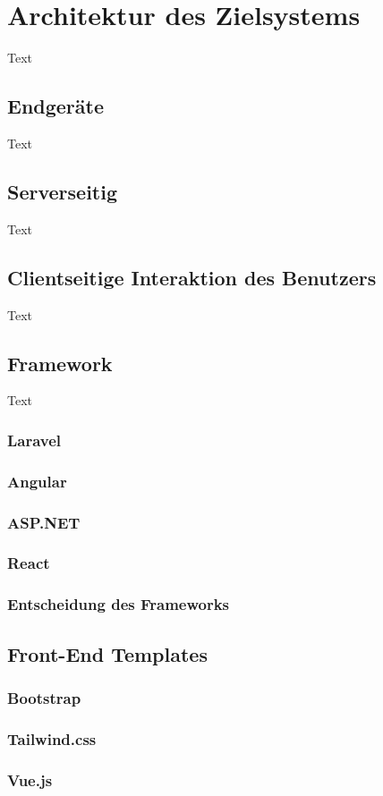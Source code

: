 \section{Architektur des Zielsystems}
Text

\subsection{Endgeräte}
Text
\subsection{Serverseitig}
Text
\subsection{Clientseitige Interaktion des Benutzers}
Text
\subsection{Framework}
Text
\subsubsection{Laravel}
\subsubsection{Angular}
\subsubsection{ASP.NET}
\subsubsection{React}
\subsubsection{Entscheidung des Frameworks}
\subsection{Front-End Templates}
\subsubsection{Bootstrap}
\subsubsection{Tailwind.css}
\subsubsection{Vue.js}
